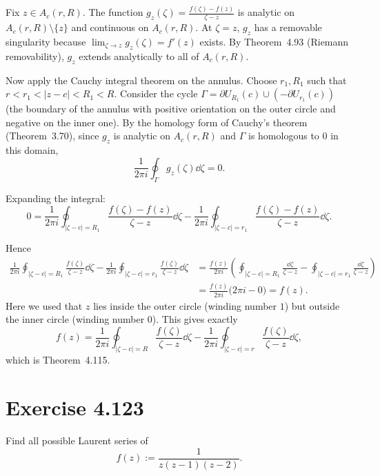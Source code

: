 \documentclass{article}
\begin{document}
\begin{solution}
  Fix $z \in A_c(r, R)$. The function $g_z(\zeta) = \frac{f(\zeta)-f(z)}{\zeta-z}$
  is analytic on $A_c(r, R) \setminus \{z\}$ and continuous on $A_c(r, R)$.
  At $\zeta = z$, $g_z$ has a removable singularity because
  $\lim_{\zeta \to z} g_z(\zeta) = f'(z)$ exists. By Theorem~4.93 (Riemann
  removability), $g_z$ extends analytically to all of $A_c(r, R)$.

  Now apply the Cauchy integral theorem on the annulus. Choose $r_1, R_1$ such
  that $r < r_1 < |z-c| < R_1 < R$. Consider the cycle
  $\Gamma = \partial U_{R_1}(c) \cup (-\partial U_{r_1}(c))$ (the boundary of
  the annulus with positive orientation on the outer circle and negative on the
  inner one). By the homology form of Cauchy's theorem (Theorem~3.70), since
  $g_z$ is analytic on $A_c(r, R)$ and $\Gamma$ is homologous to $0$ in this
  domain,
  \[
    \frac{1}{2\pi i} \oint_{\Gamma} g_z(\zeta) \dd \zeta = 0.
  \]

  Expanding the integral:
  \[
    0 = \frac{1}{2\pi i} \oint_{|\zeta-c|=R_1} \frac{f(\zeta)-f(z)}{\zeta-z} \dd\zeta
    - \frac{1}{2\pi i} \oint_{|\zeta-c|=r_1} \frac{f(\zeta)-f(z)}{\zeta-z} \dd\zeta.
  \]

  Hence
  \begin{align*}
    \frac{1}{2\pi i} \oint_{|\zeta-c|=R_1} \frac{f(\zeta)}{\zeta-z} \dd\zeta
    - \frac{1}{2\pi i} \oint_{|\zeta-c|=r_1} \frac{f(\zeta)}{\zeta-z} \dd\zeta
    &= \frac{f(z)}{2\pi i} \left(
      \oint_{|\zeta-c|=R_1} \frac{\dd\zeta}{\zeta-z}
      - \oint_{|\zeta-c|=r_1} \frac{\dd\zeta}{\zeta-z}
    \right)\\
    &= \frac{f(z)}{2\pi i} \bigl(2\pi i - 0\bigr) = f(z).
  \end{align*}
  Here we used that $z$ lies inside the outer circle (winding number $1$) but
  outside the inner circle (winding number $0$). This gives exactly
  \[
    f(z) = \frac{1}{2\pi i} \oint_{|\zeta-c|=R} \frac{f(\zeta)}{\zeta-z} \dd\zeta
    - \frac{1}{2\pi i} \oint_{|\zeta-c|=r} \frac{f(\zeta)}{\zeta-z} \dd\zeta,
  \]
  which is Theorem~4.115.
\end{solution}

\section{Exercise 4.123}

Find all possible Laurent series of
\[
  f(z) := \frac{1}{z(z-1)(z-2)}.
\]
\end{document}

